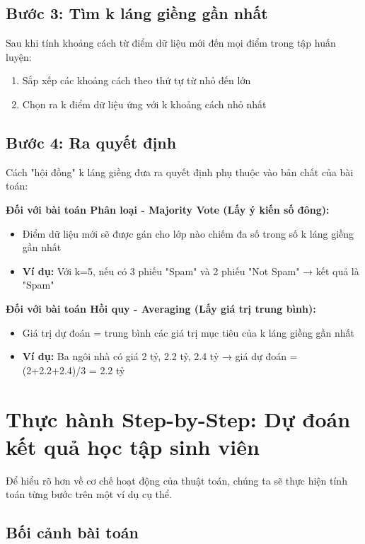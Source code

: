 \subsection{Bước 3: Tìm k láng giềng gần nhất}

Sau khi tính khoảng cách từ điểm dữ liệu mới đến mọi điểm trong tập huấn luyện:
\begin{enumerate}
\item Sắp xếp các khoảng cách theo thứ tự từ nhỏ đến lớn
\item Chọn ra k điểm dữ liệu ứng với k khoảng cách nhỏ nhất
\end{enumerate}

\subsection{Bước 4: Ra quyết định}

Cách "hội đồng" k láng giềng đưa ra quyết định phụ thuộc vào bản chất của bài toán:

\textbf{Đối với bài toán Phân loại - Majority Vote (Lấy ý kiến số đông):}
\begin{itemize}
\item Điểm dữ liệu mới sẽ được gán cho lớp nào chiếm đa số trong số k láng giềng gần nhất
\item \textbf{Ví dụ:} Với k=5, nếu có 3 phiếu "Spam" và 2 phiếu "Not Spam" → kết quả là "Spam"
\end{itemize}

\textbf{Đối với bài toán Hồi quy - Averaging (Lấy giá trị trung bình):}
\begin{itemize}
\item Giá trị dự đoán = trung bình các giá trị mục tiêu của k láng giềng gần nhất
\item \textbf{Ví dụ:} Ba ngôi nhà có giá 2 tỷ, 2.2 tỷ, 2.4 tỷ → giá dự đoán = (2+2.2+2.4)/3 = 2.2 tỷ
\end{itemize}

\section{Thực hành Step-by-Step: Dự đoán kết quả học tập sinh viên}

Để hiểu rõ hơn về cơ chế hoạt động của thuật toán, chúng ta sẽ thực hiện tính toán từng bước trên một ví dụ cụ thể.

\subsection{Bối cảnh bài toán}

